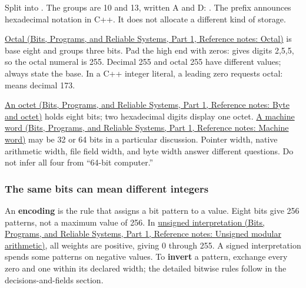 Split  into . The groups are 10 and 13, written A and D: . The prefix  announces hexadecimal notation in C++. It does not allocate a different kind of storage.

\href{../01-Bits-Programs-and-Reliable-Systems-P01/main.pdf\#nameddest=appendix-17fc1bc8b305}{Octal (Bits, Programs, and Reliable Systems, Part 1, Reference notes: Octal)} is base eight and groups three bits. Pad the high end with zeros:  gives digits 2,5,5, so the octal numeral is 255. Decimal 255 and octal 255 have different values; always state the base. In a C++ integer literal, a leading zero requests octal:  means decimal 173.

\href{../01-Bits-Programs-and-Reliable-Systems-P01/main.pdf\#nameddest=appendix-5bee2df85484}{An octet (Bits, Programs, and Reliable Systems, Part 1, Reference notes: Byte and octet)} holds eight bits; two hexadecimal digits display one octet. \href{../01-Bits-Programs-and-Reliable-Systems-P01/main.pdf\#nameddest=appendix-d67a19507dc5}{A machine word (Bits, Programs, and Reliable Systems, Part 1, Reference notes: Machine word)} may be 32 or 64 bits in a particular discussion. Pointer width, native arithmetic width, file field width, and byte width answer different questions. Do not infer all four from ``64-bit computer.''

\subsubsection{The same bits can mean different integers}\label{05-engine-i-ch001-the-same-bits-can-mean-different-integers}

\hypertarget{05-engine-i-ch001-the-same-bits-can-mean-different-integers}{}

An \textbf{encoding} is the rule that assigns a bit pattern to a value. Eight bits give 256 patterns, not a maximum value of 256. In \href{../01-Bits-Programs-and-Reliable-Systems-P01/main.pdf\#nameddest=appendix-c99977d88b33}{unsigned interpretation (Bits, Programs, and Reliable Systems, Part 1, Reference notes: Unsigned modular arithmetic)}, all weights are positive, giving 0 through 255. A signed interpretation spends some patterns on negative values. To \textbf{invert} a pattern, exchange every zero and one within its declared width; the detailed bitwise rules follow in the decisions-and-fields section.

